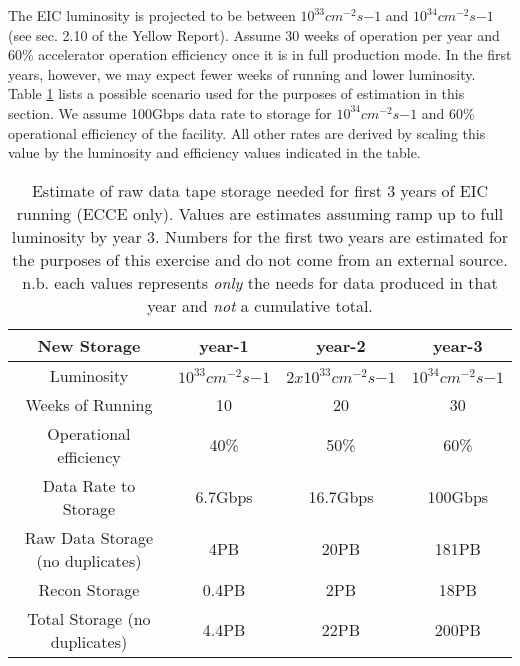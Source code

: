 


The EIC luminosity is projected to be between $10^{33}cm^{-2}s{-1}$ and $10^{34}cm^{-2}s{-1}$ (see sec. 2.10 of the Yellow Report\cite{eic_yellow_report_v1_1}). Assume 30 weeks of operation per year and 60\% accelerator operation efficiency once it is in full production mode. In the first years, however, we may expect fewer weeks of running and lower luminosity. Table \ref{tab:integrated_luminosity_by_year} lists a possible scenario used for the purposes of estimation in this section. We assume 100Gbps data rate to storage for $10^{34}cm^{-2}s{-1}$ and 60\% operational efficiency of the facility. All other rates are derived by scaling this value by the luminosity and efficiency values indicated in the table.


\begin{table}[htb!]
    \centering
    \begin{tabular}{c|c|c|c}
        \hline
        \hline
         \textbf{New Storage}       & year-1                & year-2                  & year-3                \\
        \hline
         Luminosity              & $10^{33}cm^{-2}s{-1}$ & $2x10^{33}cm^{-2}s{-1}$ & $10^{34}cm^{-2}s{-1}$ \\
         \hline
         Weeks of Running        & 10                    & 20                      & 30                    \\
         \hline
         Operational efficiency    & 40\%                  & 50\%                    & 60\%                  \\
         \hline
         Data Rate to Storage    & 6.7Gbps               & 16.7Gbps                & 100Gbps               \\
         \hline
         Raw Data Storage (no duplicates) & 4PB          & 20PB                    & 181PB                 \\
         \hline
         Recon Storage          & 0.4PB                  & 2PB                    & 18PB                   \\
         \hline
         Total Storage (no duplicates) & 4.4PB           & 22PB                   & 200PB                  \\
         \hline
   \end{tabular}
    \caption{Estimate of raw data tape storage needed for first 3 years of EIC running (ECCE only). Values are estimates assuming ramp up to full luminosity  by year 3. Numbers for the first two years are estimated for the purposes of this exercise and do not come from an external source. n.b. each values represents \emph{only} the needs for data produced in that year and \emph{not} a cumulative total.}
    \label{tab:integrated_luminosity_by_year}
\end{table}

